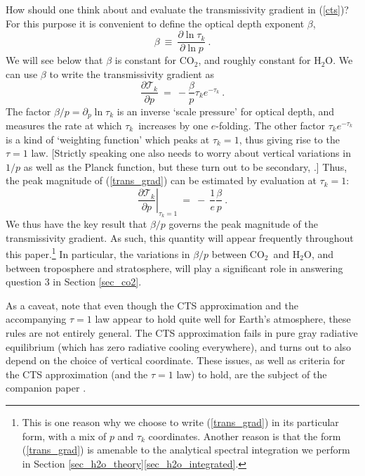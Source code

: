 \documentclass{ametsoc}
\newcommand{\beqn}{\begin{equation}}
\newcommand{\eeqn}{\end{equation}}
\newcommand{\eqnref}[1]{(\ref{#1})}
\newcommand{\partialder}[2]{\ensuremath{\frac{\partial #1}{\partial #2}}}
\newcommand{\ppp}{\ensuremath{\partial_p}}
\newcommand{\cotwo}{\ensuremath{\mathrm{CO_2}}}
\newcommand{\htwo}{\ensuremath{\mathrm{H_2O}}}
\newcommand{\trans}{\ensuremath{\mathcal{T}}}
\newcommand{\tauk}{\ensuremath{\tau_k}}
\newcommand{\taumax}{\ensuremath{\tau_{\text{max}}}}
\begin{document}
How should one think about and evaluate the transmissivity gradient in \eqnref{cts}? For this purpose it is convenient to define the optical depth exponent $\beta$, 
\beqn
		\beta \  \equiv  \ \partialder{\ln \tauk}{\ln p} \ . 
		\label{beta_def}
\eeqn
We will see below that $\beta$ is constant for \cotwo, and roughly constant for \htwo.
We can use $\beta$ to write the transmissivity gradient as 
 \beqn
 		\partialder{\trans_k}{p} \  =  \ -\frac{\beta}{p} \tauk e^{-\tauk}  \ .
		 \label{trans_grad} 
\eeqn
The factor $\beta/p=\ppp\ln\tauk$  is an inverse  `scale pressure' for optical depth, and measures the rate at which  \tauk\ increases by one $e$-folding. The other factor  $\tauk e^{-\tauk}$ is a kind of `weighting function' which peaks at $\tauk=1$, thus giving rise to  the $\tau=1$ law.  [Strictly speaking one also needs to worry about vertical variations in $1/p$ as well as the Planck function, but these turn out to be secondary, \cite{jeevanjee2019b}.] Thus, the peak magnitude of \eqnref{trans_grad} can be estimated by evaluation  at $\tauk=1$:
\beqn
	\left. \partialder{\trans_k}{p} \right |_{\tauk=1}  \ =  \ -\ \frac{1}{e}\frac{\beta}{p} \ .
	\label{trans_grad_tau1}
\eeqn
 We thus have the key result that $\beta/p$ governs the peak magnitude of the transmissivity gradient. As such, this quantity will appear frequently  throughout this paper.\footnote{This is one reason why we choose to write \eqnref{trans_grad} in its particular form, with a mix of $p$ and $\tauk$ coordinates. Another reason is that the form \eqnref{trans_grad} is amenable to the analytical spectral integration we perform in Section \ref{sec_h2o_theory}\ref{sec_h2o_integrated}.} 
In particular, the variations in $\beta/p$ between  \cotwo\ and \htwo, and between troposphere and stratosphere, will  play a significant role in answering question 3 in Section \ref{sec_co2}. 
 
 As a caveat, note that even though the CTS approximation and the accompanying $\tau=1$ law appear to hold quite well for Earth's atmosphere, these rules are not entirely general. The CTS approximation fails in pure gray radiative equilibrium (which has zero radiative cooling everywhere), and turns out to also depend on the choice of vertical coordinate. These issues, as well as criteria for the CTS approximation (and the $\tau=1$ law) to hold,  are the subject of the companion paper   \cite{jeevanjee2019b}.
 
\end{document}
